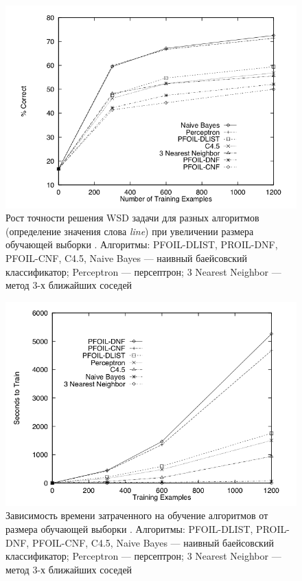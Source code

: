 \documentclass{article}
\begin{document}
\begin{articletext}
\begin{figure}[H]
\includegraphics[keepaspectratio=true,
 width=0.9\columnwidth]{line_wsd_1_accuracy.png}
\caption{Рост точности решения WSD задачи для разных алгоритмов (определение значения слова \textit{line}) при увеличении размера обучающей выборки \cite{Mooney 1996}. Алгоритмы: PFOIL-DLIST, PROIL-DNF, PFOIL-CNF, C4.5, Naive Bayes --- наивный баейсовский классификатор; Perceptron --- персептрон; 3 Nearest Neighbor --- метод 3-х ближайших соседей}
\label{kor1}
\end{figure}


\begin{figure}[H]
\includegraphics[keepaspectratio=true,
 width=0.9\columnwidth]{line_wsd_2_time.png}
\caption{Зависимость времени затраченного на обучение алгоритмов от размера обучающей выборки \cite{Mooney 1996}. Алгоритмы: PFOIL-DLIST, PROIL-DNF, PFOIL-CNF, C4.5, Naive Bayes --- наивный баейсовский классификатор; Perceptron --- персептрон; 3 Nearest Neighbor --- метод 3-х ближайших соседей}
\label{kor2}
\end{figure}


\end{articletext}
\end{document}
